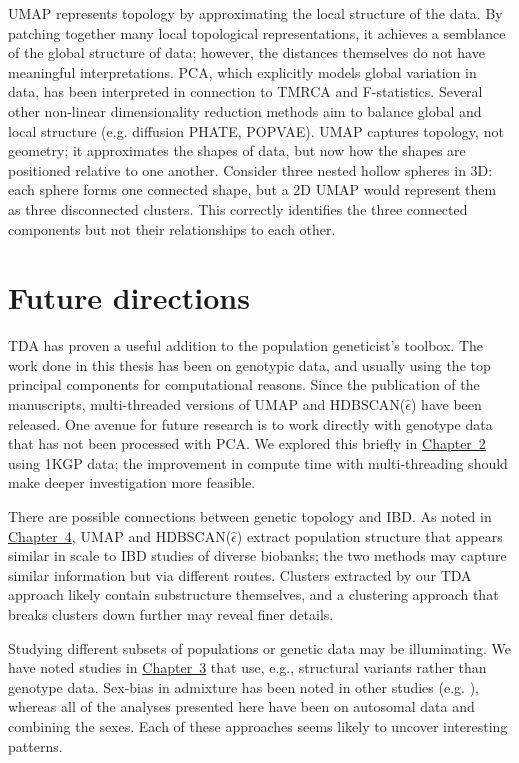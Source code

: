 UMAP represents topology by approximating the local structure of the data. By patching together many local topological representations, it achieves a semblance of the global structure of data; however, the distances themselves do not have meaningful interpretations. PCA, which explicitly models global variation in data, has been interpreted in connection to TMRCA and F-statistics\citep{mcvean2009genealogical,peter_geometric_2022}. Several other non-linear dimensionality reduction methods aim to balance global and local structure (e.g. diffusion PHATE\citep{moon2019visualizing}, POPVAE\citep{battey_visualizing_2021}). UMAP captures topology, not geometry; it approximates the shapes of data, but now how the shapes are positioned relative to one another. Consider three nested hollow spheres in $3$D: each sphere forms one connected shape, but a $2$D UMAP would represent them as three disconnected clusters\citep{herrmann_enhancing_2022}. This correctly identifies the three connected components but not their relationships to each other.

\section{Future directions}

TDA has proven a useful addition to the population geneticist's toolbox. The work done in this thesis has been on genotypic data, and usually using the top principal components for computational reasons. Since the publication of the manuscripts, multi-threaded versions of UMAP and HDBSCAN($\hat{\epsilon}$) have been released. One avenue for future research is to work directly with genotype data that has not been processed with PCA. We explored this briefly in \hyperref[chap:chapter2]{Chapter~2} using 1KGP data; the improvement in compute time with multi-threading should make deeper investigation more feasible.

There are possible connections between genetic topology and IBD. As noted in \hyperref[chap:chapter4]{Chapter~4}, UMAP and HDBSCAN($\hat{\epsilon}$) extract population structure that appears similar in scale to IBD studies of diverse biobanks; the two methods may capture similar information but via different routes. Clusters extracted by our TDA approach likely contain substructure themselves, and a clustering approach that breaks clusters down further may reveal finer details.

Studying different subsets of populations or genetic data may be illuminating. We have noted studies in \hyperref[chap:chapter3]{Chapter~3} that use, e.g., structural variants rather than genotype data. Sex-bias in admixture has been noted in other studies (e.g. \citep{ongaro_evaluating_2021,korunes_sex-biased_2022,marcheco-teruel_cuba_2014}), whereas all of the analyses presented here have been on autosomal data and combining the sexes. Each of these approaches seems likely to uncover interesting patterns.

